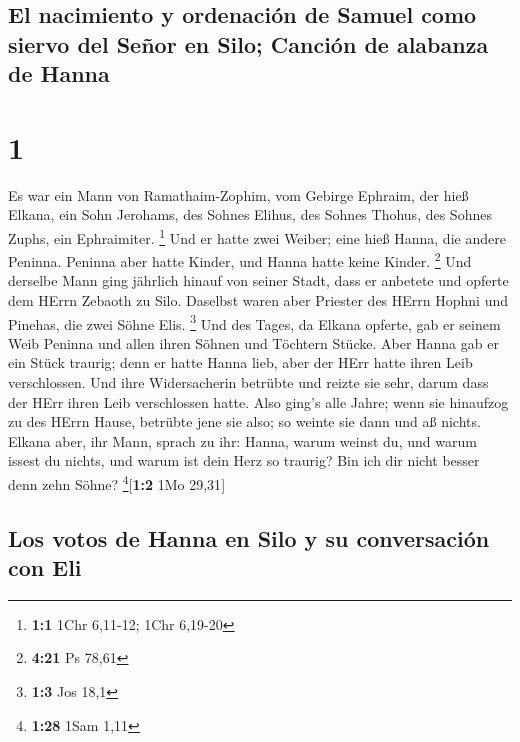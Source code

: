 \hypertarget{el-nacimiento-y-ordenaciuxf3n-de-samuel-como-siervo-del-seuxf1or-en-silo-canciuxf3n-de-alabanza-de-hanna}{%
\subsection{El nacimiento y ordenación de Samuel como siervo del Señor
en Silo; Canción de alabanza de
Hanna}\label{el-nacimiento-y-ordenaciuxf3n-de-samuel-como-siervo-del-seuxf1or-en-silo-canciuxf3n-de-alabanza-de-hanna}}

\hypertarget{section}{%
\section{1}\label{section}}

 Es war ein Mann von Ramathaim-Zophim, vom Gebirge
Ephraim, der hieß Elkana, ein Sohn Jerohams, des Sohnes Elihus, des
Sohnes Thohus, des Sohnes Zuphs, ein Ephraimiter. \footnote{\textbf{1:1}
  1Chr 6,11-12; 1Chr 6,19-20}  Und er hatte zwei Weiber;
eine hieß Hanna, die andere Peninna. Peninna aber hatte Kinder, und
Hanna hatte keine Kinder. \footnote{\textbf{4:21} Ps 78,61}
 Und derselbe Mann ging jährlich hinauf von seiner Stadt,
dass er anbetete und opferte dem HErrn Zebaoth zu Silo. Daselbst waren
aber Priester des HErrn Hophni und Pinehas, die zwei Söhne Elis.
\footnote{\textbf{1:3} Jos 18,1}  Und des Tages, da Elkana
opferte, gab er seinem Weib Peninna und allen ihren Söhnen und Töchtern
Stücke.  Aber Hanna gab er ein Stück traurig; denn er
hatte Hanna lieb, aber der HErr hatte ihren Leib verschlossen.
 Und ihre Widersacherin betrübte und reizte sie sehr,
darum dass der HErr ihren Leib verschlossen hatte.  Also
ging's alle Jahre; wenn sie hinaufzog zu des HErrn Hause, betrübte jene
sie also; so weinte sie dann und aß nichts.  Elkana aber,
ihr Mann, sprach zu ihr: Hanna, warum weinst du, und warum issest du
nichts, und warum ist dein Herz so traurig? Bin ich dir nicht besser
denn zehn Söhne? \footnote{\textbf{1:28} 1Sam 1,11}{[}\textbf{1:2} 1Mo
29,31{]}

\hypertarget{los-votos-de-hanna-en-silo-y-su-conversaciuxf3n-con-eli}{%
\subsection{Los votos de Hanna en Silo y su conversación con
Eli}\label{los-votos-de-hanna-en-silo-y-su-conversaciuxf3n-con-eli}}

